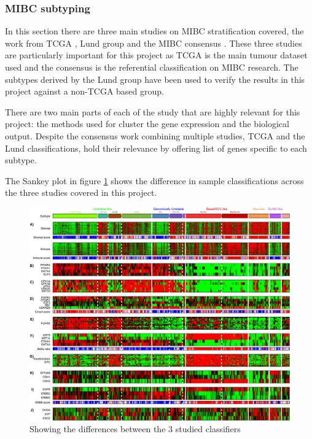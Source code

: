 \subsubsection{MIBC subtyping}

In this section there are three main studies on MIBC stratification covered, the work from TCGA \citet{Robertson2017-mg}, Lund group \cite{Marzouka2018-ge} and the MIBC consensus \cite{Kamoun2020-tj}. These three studies are particularly important for this project as TCGA is the main tumour dataset used and the consensus is the referential classification on MIBC research. The subtypes derived by the Lund group have been used to verify the results in this project against a non-TCGA based group.

There are two main parts of each of the study that are highly relevant for this project: the methods used for cluster the gene expression and the biological output. Despite the consensus work combining multiple studies, TCGA and the Lund classifications, hold their relevance by offering list of genes specific to each subtype. 

The Sankey plot in figure \cref{fig:lit:subtypes_comp} shows the difference in sample classifications across the three studies covered in this project.

\begin{figure}[!htb]   
\centering
\includegraphics[width=1.0\textwidth,height=1.0\textheight,keepaspectratio]{Sections/Lit_review/Resources/Lung_subtypes.jpg}
  \caption{Showing the differences between the 3 studied classifiers}
\label{fig:lit:subtypes_comp}
\end{figure}
\FloatBarrier

